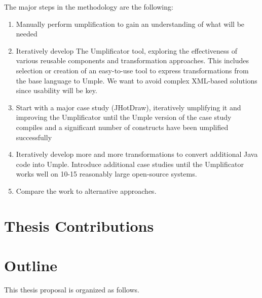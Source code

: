 The major steps in the methodology are the following:
\begin{enumerate}
\item 	Manually perform umplification to gain an understanding of what will be needed
\item 	Iteratively develop The Umplificator tool, exploring the effectiveness of various reusable components and transformation approaches. This includes selection or creation of an easy-to-use tool to express transformations from the base language to Umple. We want to avoid complex XML-based solutions since usability will be key.
\item 	Start with a major case study (JHotDraw), iteratively umplifying it and improving the Umplificator until the Umple version of the case study compiles and a significant number of constructs have been umplified successfully
\item 	Iteratively develop more and more transformations to convert additional Java code into Umple. Introduce additional case studies until the Umplificator works well on 10-15 reasonably large open-source systems.
\item 	Compare the work to alternative approaches.
\end{enumerate}

\section{Thesis Contributions}
\section{Outline}
This thesis proposal is organized as follows.

